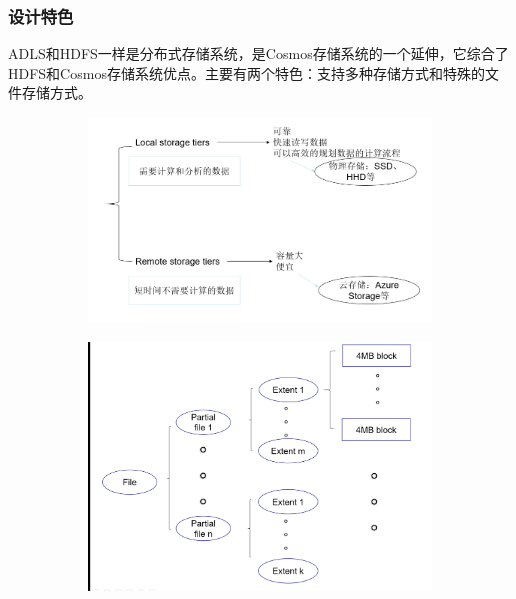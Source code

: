 \documentclass[11pt]{article}
\begin{document}
\subsubsection{设计特色}
ADLS和HDFS一样是分布式存储系统，是Cosmos存储系统的一个延伸，它综合了HDFS和Cosmos存储系统优点。主要有两个特色：支持多种存储方式和特殊的文件存储方式。
\begin{figure}[!htbp]
	\begin{subfigure}[b]{0.5\linewidth}
		\includegraphics[width=\linewidth]{figs/data_store.png}
		\caption{}
		\label{fig:data_store}
	\end{subfigure}
	\begin{subfigure}[b]{0.5\linewidth}
		\includegraphics[width=0.8\linewidth]{figs/file_store.png}
		\caption{}
	\end{subfigure}
	\caption{}
\end{figure}
\end{document}
